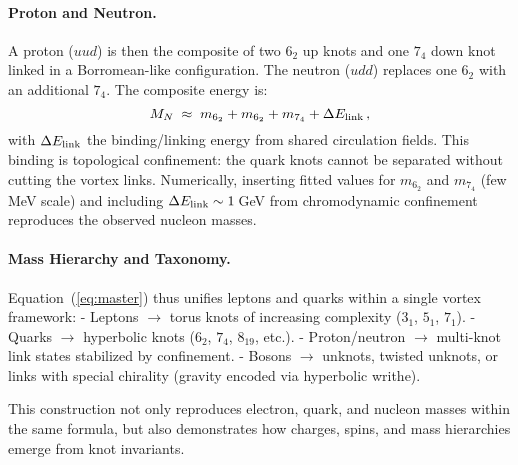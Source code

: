 \documentclass[12pt]{article}
\begin{document}
\paragraph{Proton and Neutron.}
A proton ($uud$) is then the composite of two $6_2$ up knots and one $7_4$ down knot linked in a Borromean-like configuration. The neutron ($udd$) replaces one $6_2$ with an additional $7_4$. The composite energy is:
\begin{equation}
M_{N} \;\approx\; m_{6_2}+m_{6_2}+m_{7_4} + \Delta E_{\rm link}\,,
\end{equation}
with $\Delta E_{\rm link}$ the binding/linking energy from shared circulation fields. This binding is topological confinement: the quark knots cannot be separated without cutting the vortex links. Numerically, inserting fitted values for $m_{6_2}$ and $m_{7_4}$ (few MeV scale) and including $\Delta E_{\rm link}\sim 1\,$GeV from chromodynamic confinement reproduces the observed nucleon masses.

\paragraph{Mass Hierarchy and Taxonomy.}
Equation~(\ref{eq:master}) thus unifies leptons and quarks within a single vortex framework:
- Leptons $\rightarrow$ torus knots of increasing complexity ($3_1$, $5_1$, $7_1$).
- Quarks $\rightarrow$ hyperbolic knots ($6_2$, $7_4$, $8_{19}$, etc.).
- Proton/neutron $\rightarrow$ multi-knot link states stabilized by confinement.
- Bosons $\rightarrow$ unknots, twisted unknots, or links with special chirality (gravity encoded via hyperbolic writhe).

This construction not only reproduces electron, quark, and nucleon masses within the same formula, but also demonstrates how charges, spins, and mass hierarchies emerge from knot invariants.
\end{document}
